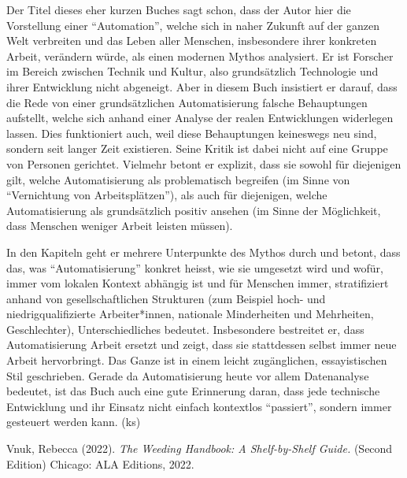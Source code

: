 \documentclass[a4paper,
fontsize=11pt,
oneside,
numbers=noperiodatend,
parskip=half-,
bibliography=totoc,
final
]{scrartcl}
\begin{document}
Der Titel dieses eher kurzen Buches sagt schon, dass der Autor hier die
Vorstellung einer \enquote{Automation}, welche sich in naher Zukunft auf
der ganzen Welt verbreiten und das Leben aller Menschen, insbesondere
ihrer konkreten Arbeit, verändern würde, als einen modernen Mythos
analysiert. Er ist Forscher im Bereich zwischen Technik und Kultur, also
grundsätzlich Technologie und ihrer Entwicklung nicht abgeneigt. Aber in
diesem Buch insistiert er darauf, dass die Rede von einer
grundsätzlichen Automatisierung falsche Behauptungen aufstellt, welche
sich anhand einer Analyse der realen Entwicklungen widerlegen lassen.
Dies funktioniert auch, weil diese Behauptungen keineswegs neu sind,
sondern seit langer Zeit existieren. Seine Kritik ist dabei nicht auf
eine Gruppe von Personen gerichtet. Vielmehr betont er explizit, dass
sie sowohl für diejenigen gilt, welche Automatisierung als problematisch
begreifen (im Sinne von \enquote{Vernichtung von Arbeitsplätzen}), als
auch für diejenigen, welche Automatisierung als grundsätzlich positiv
ansehen (im Sinne der Möglichkeit, dass Menschen weniger Arbeit leisten
müssen).

In den Kapiteln geht er mehrere Unterpunkte des Mythos durch und betont,
dass das, was \enquote{Automatisierung} konkret heisst, wie sie
umgesetzt wird und wofür, immer vom lokalen Kontext abhängig ist und für
Menschen immer, stratifiziert anhand von gesellschaftlichen Strukturen
(zum Beispiel hoch- und niedrigqualifizierte Arbeiter*innen, nationale
Minderheiten und Mehrheiten, Geschlechter), Unterschiedliches bedeutet.
Insbesondere bestreitet er, dass Automatisierung Arbeit ersetzt und
zeigt, dass sie stattdessen selbst immer neue Arbeit hervorbringt. Das
Ganze ist in einem leicht zugänglichen, essayistischen Stil geschrieben.
Gerade da Automatisierung heute vor allem Datenanalyse bedeutet, ist das
Buch auch eine gute Erinnerung daran, dass jede technische Entwicklung
und ihr Einsatz nicht einfach kontextlos \enquote{passiert}, sondern
immer gesteuert werden kann. (ks)

Vnuk, Rebecca (2022). \emph{The Weeding Handbook: A Shelf-by-Shelf
Guide.} (Second Edition) Chicago: ALA Editions, 2022.
\end{document}

